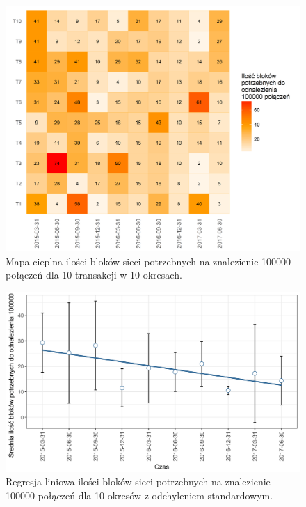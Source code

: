 \documentclass[12pt, twoside, final, openany]{mgr}
\newcommand{\chartsWidth}{0.8}
\begin{document}
\begin{figure}[H]
\centering
   \includegraphics[width=\chartsWidth\linewidth]{pictures/ilosc_blokow/ilosc_blokow_hm.png}
   \caption{Mapa cieplna ilości bloków sieci potrzebnych na znalezienie 100000 połączeń dla 10 transakcji w 10 okresach.}
   \label{fig:ib1} 
\end{figure}
\begin{figure}[H]
\centering
   \includegraphics[width=\chartsWidth\linewidth]{pictures/ilosc_blokow/ilosc_blokow_sda.png}
   \caption{Regresja liniowa ilości bloków sieci potrzebnych na znalezienie 100000 połączeń dla 10 okresów z odchyleniem standardowym.}
   \label{fig:ib2}
\end{figure}
\end{document}
